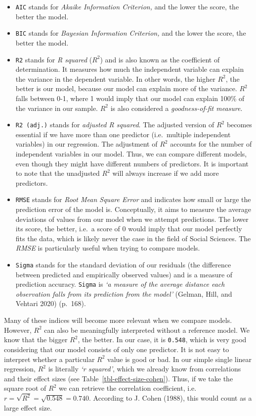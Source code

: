 \documentclass[
  letterpaper,
  DIV=11,
  numbers=noendperiod]{scrreprt}
\begin{document}
\begin{itemize}
\item
  \texttt{AIC} stands for \emph{Akaike Information Criterion,} and the
  lower the score, the better the model.
\item
  \texttt{BIC} stands for \emph{Bayesian Information Criterion,} and the
  lower the score, the better the model.
\item
  \texttt{R2} stands for \emph{R squared} (\(R^2\)) and is also known as
  the coefficient of determination. It measures how much the independent
  variable can explain the variance in the dependent variable. In other
  words, the higher \(R^2\), the better is our model, because our model
  can explain more of the variance. \(R^2\) falls between 0-1, where 1
  would imply that our model can explain 100\% of the variance in our
  sample. \(R^2\) is also considered a \emph{goodness-of-fit measure}.
\item
  \texttt{R2\ (adj.)} stands for \emph{adjusted R squared}. The adjusted
  version of \(R^2\) becomes essential if we have more than one
  predictor (i.e.~multiple independent variables) in our regression. The
  adjustment of \(R^2\) accounts for the number of independent variables
  in our model. Thus, we can compare different models, even though they
  might have different numbers of predictors. It is important to note
  that the unadjusted \(R^2\) will always increase if we add more
  predictors.
\item
  \texttt{RMSE} stands for \emph{Root Mean Square Error} and indicates
  how small or large the prediction error of the model is. Conceptually,
  it aims to measure the average deviations of values from our model
  when we attempt predictions. The lower its score, the better, i.e.~a
  score of 0 would imply that our model perfectly fits the data, which
  is likely never the case in the field of Social Sciences. The
  \emph{RMSE} is particularly useful when trying to compare models.
\item
  \texttt{Sigma} stands for the standard deviation of our residuals (the
  difference between predicted and empirically observed values) and is a
  measure of prediction accuracy. \texttt{Sigma} is \emph{`a measure of
  the average distance each observation falls from its prediction from
  the model'} (Gelman, Hill, and Vehtari 2020) (p.~168).
\end{itemize}

Many of these indices will become more relevant when we compare models.
However, \(R^2\) can also be meaningfully interpreted without a
reference model. We know that the bigger \(R^2\), the better. In our
case, it is \texttt{0.548}, which is very good considering that our
model consists of only one predictor. It is not easy to interpret
whether a particular \(R^2\) value is good or bad. In our simple single
linear regression, \(R^2\) is literally \emph{`r squared'}, which we
already know from correlations and their effect sizes (see
Table~\ref{tbl-effect-size-cohen}). Thus, if we take the square root of
\(R^2\) we can retrieve the correlation coefficient,
i.e.~\(r = \sqrt{R^2} = \sqrt{0.548} = 0.740\). According to J. Cohen
(1988), this would count as a large effect size.
\end{document}
